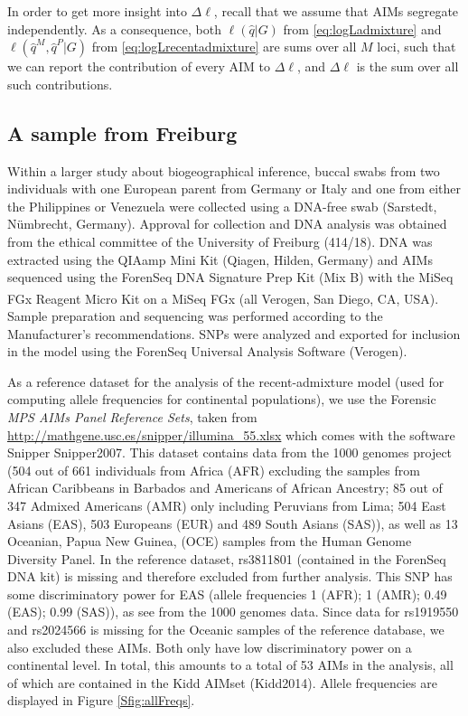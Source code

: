 \documentclass[12pt]{article}
\theoremstyle{definition}
\begin{document}
In order to get more insight into $\Delta\ell$, recall that we assume
that AIMs segregate independently. As a consequence, both
$\ell(\hat q|G)$ from \eqref{eq:logLadmixture} and
$\ell(\hat q^M, \hat q^P|G)$ from \eqref{eq:logLrecentadmixture} are
sums over all $M$ loci, such that we can report the contribution of
every AIM to $\Delta\ell$, and $\Delta\ell$ is the sum over all such
contributions.

\subsection{A sample from Freiburg}
Within a larger study about biogeographical inference, buccal swabs
from two individuals with one European parent from Germany or Italy
and one from either the Philippines or Venezuela were collected using
a DNA-free swab (Sarstedt, Nümbrecht, Germany). Approval for
collection and DNA analysis was obtained from the ethical committee of
the University of Freiburg (414/18). DNA was extracted using the
QIAamp Mini Kit (Qiagen, Hilden, Germany) and AIMs sequenced using the
ForenSeq DNA Signature Prep Kit (Mix B) with the MiSeq
FGx\textsuperscript{\textregistered} Reagent Micro Kit on a MiSeq FGx
(all Verogen, San Diego, CA, USA). Sample preparation and sequencing
was performed according to the Manufacturer's recommendations. SNPs
were analyzed and exported for inclusion in the model using the
ForenSeq Universal Analysis Software (Verogen).

As a reference dataset for the analysis of the recent-admixture model
(used for computing allele frequencies for continental populations),
we use the Forensic {\em MPS AIMs Panel Reference Sets}, taken from
\url{http://mathgene.usc.es/snipper/illumina_55.xlsx} which comes with
the software {\sc Snipper} \cite{article}{Snipper2007}. This dataset
contains data from the 1000 genomes project (504 out of 661
individuals from Africa (AFR) excluding the samples from African
Caribbeans in Barbados and Americans of African Ancestry; 85 out of
347 Admixed Americans (AMR) only including Peruvians from Lima; 504
East Asians (EAS), 503 Europeans (EUR) and 489 South Asians (SAS)), as
well as 13 Oceanian, Papua New Guinea, (OCE) samples from the Human
Genome Diversity Panel. In the reference dataset, rs3811801 (contained
in the ForenSeq DNA kit) is missing and therefore excluded from
further analysis. This SNP has some discriminatory power for EAS
(allele frequencies 1 (AFR); 1 (AMR); 0.49 (EAS); 0.99 (SAS)), as see
from the 1000 genomes data. Since data for rs1919550 and rs2024566 is
missing for the Oceanic samples of the reference database, we also
excluded these AIMs. Both only have low discriminatory power on a
continental level. In total, this amounts to a total of 53 AIMs in the
analysis, all of which are contained in the Kidd AIMset
(\cite{article}{Kidd2014}). Allele frequencies are displayed in Figure
\ref{Sfig:allFreqs}.
\end{document}
